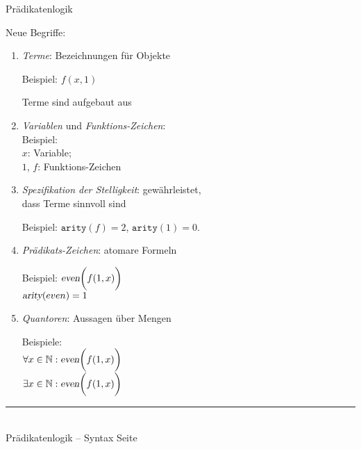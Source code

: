 \documentclass{slides}
\newcommand{\myrule}{\rule{20cm}{1mm}\\ }
\newcounter{mypage}
\begin{document}
\begin{center}
Pr\"{a}dikatenlogik
\end{center}
\vspace*{0.5cm}

\footnotesize
Neue Begriffe:
\begin{enumerate}
\item \emph{Terme}: Bezeichnungen f\"{u}r Objekte

       Beispiel: $f(x, 1)$

       Terme sind aufgebaut aus
\item \emph{Variablen} und \emph{Funktions-Zeichen}: \\

      Beispiel:\\[0.1cm]
      \hspace*{1.3cm} 
      $x$: Variable; \\
      \hspace*{1.3cm} 
      $1$, $f$: Funktions-Zeichen
\item \emph{Spezifikation der Stelligkeit}: gew\"{a}hrleistet, \\
      dass Terme sinnvoll sind

      Beispiel: $\mathtt{arity}(f) = 2$, \quad $\mathtt{arity}(1) = 0$.
\item \emph{Pr\"{a}dikats-Zeichen}: atomare Formeln

      Beispiel: $\textsl{even}\bigg(f(1,x)\bigg)$ \\[0.1cm]
      \hspace*{1.3cm} $\textsl{arity}(even) = 1$
\item \emph{Quantoren}: Aussagen \"{u}ber Mengen 

      Beispiele: \\[0.1cm]
\hspace*{1.3cm} $\forall x \in \mathbb{N}:\textsl{even}\bigg(f(1,x)\bigg)$\\[0.1cm]
\hspace*{1.3cm} $\exists x \in \mathbb{N}:\textsl{even}\bigg(f(1,x)\bigg)$\\[0.1cm]
\end{enumerate}


\vspace*{\fill}
\tiny \addtocounter{mypage}{1} 
\myrule
Pr\"{a}dikatenlogik -- Syntax \hspace*{\fill} Seite 


\end{document}
